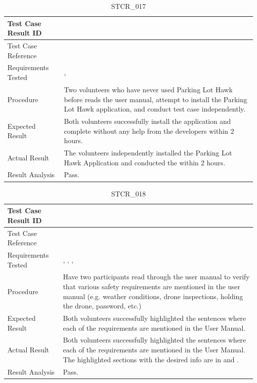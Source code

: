 \documentclass[12pt, titlepage]{article}
\begin{document}
\begin{table}[!h]
\begin{center}
\caption {STCR\_017}
\label{tab:STCR_017}
\begin{tabular}{ | m{3.2cm} | m{12.2cm} | } 
\hline
Test Case Result ID & \nameref{tab:STCR_017} \\ 
\hline
Test Case Reference & \nameref{tab:STC_017}  \\ 
\hline
Requirements Tested & \nameref{tab:STC_012}, \nameref{USE_004} 
\\ 
\hline
Procedure & Two volunteers who have never used Parking Lot Hawk before reads the user manual, attempt to install the Parking Lot Hawk application, and conduct test case \nameref{tab:STC_012} independently. \\
\hline
Expected Result & Both volunteers successfully install the application and complete \nameref{tab:STC_012} without any help from the developers within 2 hours.  \\ 
\hline
Actual Result &  The volunteers independently installed the Parking Lot Hawk Application and conducted the \nameref{tab:STC_012} within 2 hours. \\
\hline
Result Analysis & Pass.    \\ 
\hline
\end{tabular}
\end{center}
\end{table}


\begin{table}[!h]
\begin{center}
\caption {STCR\_018}
\label{tab:STCR_018}
\begin{tabular}{ | m{3.2cm} | m{12.2cm} | } 
\hline
Test Case Result ID & \nameref{tab:STCR_018} \\ 
\hline
Test Case Reference & \nameref{tab:STC_018}  \\ 
\hline
Requirements Tested &\nameref{SR_002}, \nameref{SR_006}, \nameref{SR_010}, \nameref{SAFE_003} \\ 
\hline
Procedure & Have two participants read through the user manual to verify that various safety requirements are mentioned in the user manual (e.g. weather conditions, drone inspections, holding the drone, password, etc.) \\
\hline
Expected Result & Both volunteers successfully highlighted the sentences where each of the requirements are mentioned in the User Manual.  \\ 
\hline
Actual Result &  Both volunteers successfully highlighted the sentences where each of the requirements are mentioned in the User Manual. The highlighted sections with the desired info are in \nameref{sec:umChecklist} and \nameref{sec:umSafety}.  \\
\hline
Result Analysis & Pass.  \\ 
\hline
\end{tabular}
\end{center}
\end{table}
\end{document}
